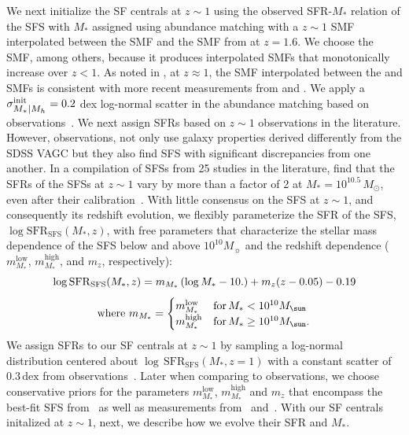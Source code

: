 \documentclass[12pt, letterpaper, preprint, tighten]{aastex62}
\newcommand{\beq}{\begin{equation}}
\newcommand{\eeq}{\end{equation}}
\newcommand{\logsfr}{\log\mathrm{SFR}}
\newcommand{\siglogm}{\sigma_{\scaleto{M_*|M_h}{8pt}}}
\begin{document}
We next initialize the SF centrals at $z\sim1$ using the observed SFR-$M_*$
relation of the SFS with $M_*$ assigned using abundance matching with a $z\sim1$ SMF
interpolated between the \cite{li2009} SMF and the SMF from \cite{marchesini2009}
at $z = 1.6$. We choose the \cite{marchesini2009} SMF, among others, because it
produces interpolated SMFs that monotonically increase over $z < 1$. As noted
in \cite{hahn2017b}, at $z \approx 1$, the SMF interpolated between the
\cite{li2009} and \cite{marchesini2009} SMFs is consistent with more recent
measurements from \cite{muzzin2013} and \cite{ilbert2013}. We apply a
$\siglogm^{\rm init} = 0.2$ dex log-normal scatter in the abundance matching based on 
observations~\citep[\emph{e.g.}][]{leauthaud2012, tinker2013, patel2015}.
We next assign SFRs based on $z \sim 1$ observations in the literature.
However, observations, not only use galaxy properties derived differently
from the SDSS VAGC but they also find SFS with significant discrepancies
from one another. In a compilation of SFSs from 25 studies in the literature, 
\cite{speagle2014} find that the SFRs of the SFSs at $z\sim1$ vary by more 
than a factor of 2 at $M_* = 10^{10.5}\, M_\odot$, even after their 
calibration~\citep[see Figure 2 of][]{speagle2014}. With little consensus 
on the SFS at $z\sim1$, and consequently its redshift evolution, we 
flexibly parameterize the SFR of the SFS, $\log\mathrm{SFR}_\mathrm{SFS}(M_*, z)$,
with free parameters that characterize the stellar mass dependence of the SFS
below and above $10^{10} M_\sun$ and the redshift dependence ($m^\mathrm{low}_{M_*}$, 
$m^\mathrm{high}_{M_*}$, and $m_z$, respectively):
\beq \label{eq:logsfr_ms}
\logsfr_{\rm SFS}(M_*, z) =  m_{M_*}\,(\log M_* - 10.) + m_z (z - 0.05) - 0.19
\eeq
\begin{equation*}
{\rm where}~m_{M_*} = \begin{cases}
m^\mathrm{low}_{M_*} & \text{for}\,M_* < 10^{10}M_\sun \\
m^\mathrm{high}_{M_*} & \text{for}\,M_* \geq 10^{10}M_\sun.
\end{cases}
\end{equation*}
We assign SFRs to our SF centrals at $z\sim1$ by sampling a log-normal
distribution centered about $\log\,\mathrm{SFR}_\mathrm{SFS}(M_*, z{=}1)$
with a constant scatter of $0.3\,\mathrm{dex}$ from observations~\citep{daddi2007, noeske2007, magdis2012, whitaker2012}.
Later when comparing to observations, we choose conservative priors
for the parameters $m^\mathrm{low}_{M_*}$, $m^\mathrm{high}_{M_*}$ and $m_z$
that encompass the best-fit SFS from~\cite{speagle2014} as well as measurements
from~\cite{moustakas2013} and~\cite{lee2015}. With our SF centrals initalized
at $z \sim 1$, next, we describe how we evolve their SFR and $M_*$.
\end{document}
